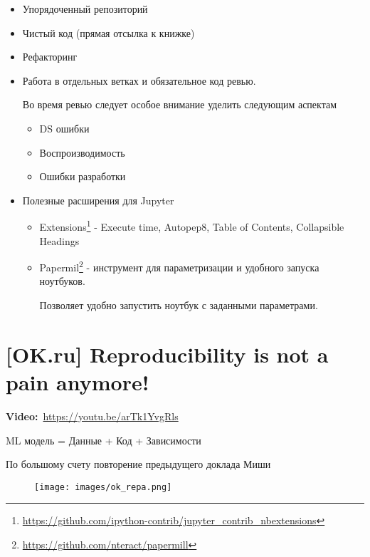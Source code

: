 \begin{itemize}
    \item Упорядоченный репозиторий
    \item Чистый код (прямая отсылка к книжке)
    \item Рефакторинг
    \item Работа в отдельных ветках и обязательное код ревью. 
        
        Во время ревью следует особое внимание уделить следующим аспектам
        \begin{itemize}
            \item DS ошибки
            \item Воспроизводимость
            \item Ошибки разработки
        \end{itemize}
        
    \item Полезные расширения для Jupyter
        \begin{itemize}
            \item Extensions\footnote{\url{https://github.com/ipython-contrib/jupyter_contrib_nbextensions}} - Execute time, Autopep8, Table of Contents, Collapsible Headings
            \item Papermil\footnote{\url{https://github.com/nteract/papermill}} - инструмент для параметризации и удобного запуска ноутбуков.
            
            Позволяет удобно запустить ноутбук с заданными параметрами.
        \end{itemize}
\end{itemize}

\section{[OK.ru] Reproducibility is not a pain anymore!}

\textbf{Video:}~\url{https://youtu.be/arTk1YvgRls} \\

\begin{center}
    ML модель = Данные + Код + Зависимости
\end{center}

По большому счету повторение предыдущего доклада Миши

\begin{figure}[ht]
    \centering
    \texttt{[image: images/ok\_repa.png]}
    \label{fig:ok_repa}
\end{figure}

